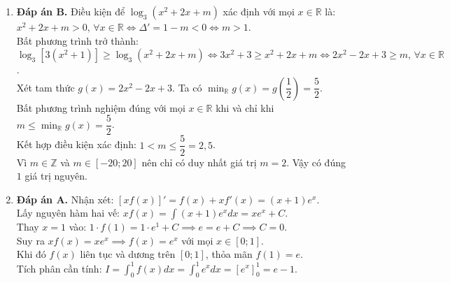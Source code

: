 \documentclass[12pt,a4paper]{article}
\begin{document}
\begin{enumerate}[label=\textbf{Câu \arabic*:}, leftmargin=*]
\item \textbf{Đáp án B.} Điều kiện để $\log_3(x^2 + 2x + m)$ xác định với mọi $x \in \mathbb{R}$ là:
$x^2 + 2x + m > 0, \, \forall x \in \mathbb{R} \iff \Delta' = 1 - m < 0 \iff m > 1$.\\
Bất phương trình trở thành:
$\log_3[3(x^2 + 1)] \ge \log_3(x^2 + 2x + m) \iff 3x^2 + 3 \ge x^2 + 2x + m \iff 2x^2 - 2x + 3 \ge m, \, \forall x \in \mathbb{R}$.\\
Xét tam thức $g(x) = 2x^2 - 2x + 3$. Ta có $\min_{\mathbb{R}} g(x) = g\left(\dfrac{1}{2}\right) = \dfrac{5}{2}$.\\
Bất phương trình nghiệm đúng với mọi $x \in \mathbb{R}$ khi và chỉ khi $m \le \min_{\mathbb{R}} g(x) = \dfrac{5}{2}$.\\
Kết hợp điều kiện xác định: $1 < m \le \dfrac{5}{2} = 2{,}5$.\\
Vì $m \in \mathbb{Z}$ và $m \in [-20; 20]$ nên chỉ có duy nhất giá trị $m = 2$. Vậy có đúng $1$ giá trị nguyên.

\item \textbf{Đáp án A.} Nhận xét: $[x f(x)]' = f(x) + x f'(x) = (x + 1)e^x$.\\
Lấy nguyên hàm hai vế:
$x f(x) = \int (x + 1)e^x dx = x e^x + C$.\\
Thay $x = 1$ vào: $1 \cdot f(1) = 1 \cdot e^1 + C \implies e = e + C \implies C = 0$.\\
Suy ra $x f(x) = x e^x \implies f(x) = e^x$ với mọi $x \in [0; 1]$.\\
Khi đó $f(x)$ liên tục và dương trên $[0; 1]$, thỏa mãn $f(1) = e$.\\
Tích phân cần tính: $I = \int_0^1 f(x) dx = \int_0^1 e^x dx = \left[ e^x \right]_0^1 = e - 1$.


\end{enumerate}
\end{document}
